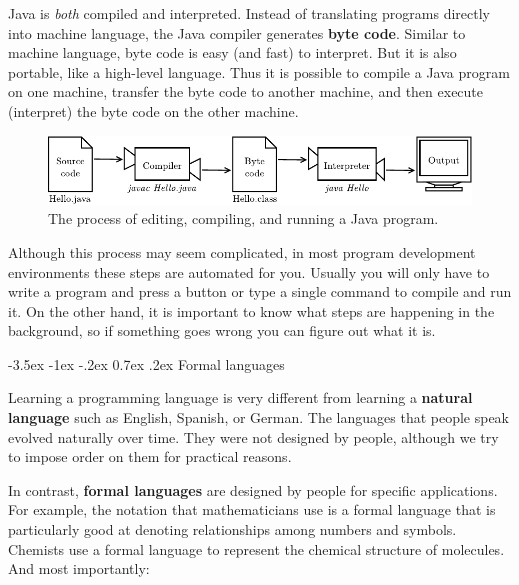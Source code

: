 \documentclass[12pt]{book}
\makeatletter
\renewcommand{\section}{\@startsection {section}{1}{\z@}%
    {-3.5ex \@plus -1ex \@minus -.2ex}%
    {0.7ex \@plus.2ex}%
    {\normalfont\Large\bfseries}}
\theoremstyle{exercise}
\makeatother
\begin{document}

Java is {\em both} compiled and interpreted.
Instead of translating programs directly into machine language, the Java compiler generates {\bf byte code}.
Similar to machine language, byte code is easy (and fast) to interpret.
But it is also portable, like a high-level language.
Thus it is possible to compile a Java program on one machine, transfer the byte code to another machine, and then execute (interpret) the byte code on the other machine.

\begin{figure}[!h]
\begin{center}
\includegraphics{figs/compiler.pdf}
\caption{The process of editing, compiling, and running a Java program.}
\end{center}
\end{figure}

Although this process may seem complicated, in most program development environments these steps are automated for you.
Usually you will only have to write a program and press a button or type a single command to compile and run it.
On the other hand, it is important to know what steps are happening in the background, so if something goes wrong you can figure out what it is.


\section{Formal languages}


Learning a programming language is very different from learning a {\bf natural language} such as English, Spanish, or German.
The languages that people speak evolved naturally over time.
They were not designed by people, although we try to impose order on them for practical reasons.


In contrast, {\bf formal languages} are designed by people for specific applications.
For example, the notation that mathematicians use is a formal language that is particularly good at denoting relationships among numbers and symbols.
Chemists use a formal language to represent the chemical structure of molecules.
And most importantly:
\end{document}
